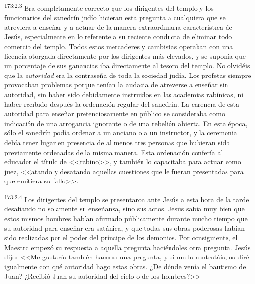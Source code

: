 \par 
\textsuperscript{173:2.3} Era completamente correcto que los dirigentes del templo y los funcionarios del sanedrín judío hicieran esta pregunta a cualquiera que se atreviera a enseñar y a actuar de la manera extraordinaria característica de Jesús, especialmente en lo referente a su reciente conducta de eliminar todo comercio del templo. Todos estos mercaderes y cambistas operaban con una licencia otorgada directamente por los dirigentes más elevados, y se suponía que un porcentaje de sus ganancias iba directamente al tesoro del templo. No olvidéis que la \textit{autoridad} era la contraseña de toda la sociedad judía. Los profetas siempre provocaban problemas porque tenían la audacia de atreverse a enseñar sin autoridad, sin haber sido debidamente instruidos en las academias rabínicas, ni haber recibido después la ordenación regular del sanedrín. La carencia de esta autoridad para enseñar pretenciosamente en público se consideraba como indicación de una arrogancia ignorante o de una rebelión abierta. En esta época, sólo el sanedrín podía ordenar a un anciano o a un instructor, y la ceremonia debía tener lugar en presencia de al menos tres personas que hubieran sido previamente ordenadas de la misma manera. Esta ordenación confería al educador el título de <<rabino>>, y también lo capacitaba para actuar como juez, <<atando y desatando aquellas cuestiones que le fueran presentadas para que emitiera su fallo>>.

\par 
\textsuperscript{173:2.4} Los dirigentes del templo se presentaron ante Jesús a esta hora de la tarde desafiando no solamente su enseñanza, sino sus actos. Jesús sabía muy bien que estos mismos hombres habían afirmado públicamente durante mucho tiempo que su autoridad para enseñar era satánica, y que todas sus obras poderosas habían sido realizadas por el poder del príncipe de los demonios. Por consiguiente, el Maestro empezó su respuesta a aquella pregunta haciéndoles otra pregunta. Jesús dijo: <<Me gustaría también haceros una pregunta, y si me la contestáis, os diré igualmente con qué autoridad hago estas obras. ¿De dónde venía el bautismo de Juan? ¿Recibió Juan su autoridad del cielo o de los hombres?>>

